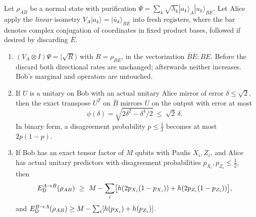 \begin{theorem}\label{thm:recovery}
Let $\rho_{AB}$ be a normal state with purification $\Psi=\sum_k\sqrt{\lambda_k}|a_k\rangle_A|u_k\rangle_{BE}$. Let Alice apply
the \emph{linear} isometry $V_A|a_k\rangle=|\bar u_k\rangle_{\bar B\bar E}$ into fresh registers, where the bar denotes
complex conjugation of coordinates in fixed product bases, followed if desired by discarding $\bar E$.
\begin{enumerate}[label=(\alph*),itemsep=1pt]
\item $(V_A\otimes I)\Psi=|\sqrt R\rangle$ with $R=\rho_{BE}$, in the vectorization $\bar B\bar E:BE$. Before the discard both
directional rates are unchanged; afterwards neither increases. Bob's marginal and operators are untouched.
\item If $U$ is a unitary on Bob with an actual unitary Alice mirror of error $\delta\le\sqrt2$, then the exact transpose
$U^T$ on $\bar B$ mirrors $U$ on the output with error at most
\[
\phi(\delta)=\sqrt{2\delta^2-\delta^4/2}\ \le\ \sqrt2\,\delta .
\]
In binary form, a disagreement probability $p\le\frac12$ becomes at most $2p(1-p)$.
\item If Bob has an exact tensor factor of $M$ qubits with Paulis $X_i,Z_i$, and Alice has actual unitary predictors with
disagreement probabilities $p_{X_i},p_{Z_i}\le\frac12$, then
\[
\ED^{A\to B}(\rho_{AB})\ \ge\ M-\sum_i\bigl[h(2p_{X_i}(1-p_{X_i}))+h(2p_{Z_i}(1-p_{Z_i}))\bigr],
\]
and $E_{\mathrm D}^{B\to A}(\rho_{AB})\ge M-\sum_i[h(p_{X_i})+h(p_{Z_i})]$.
\end{enumerate}
\end{theorem}

